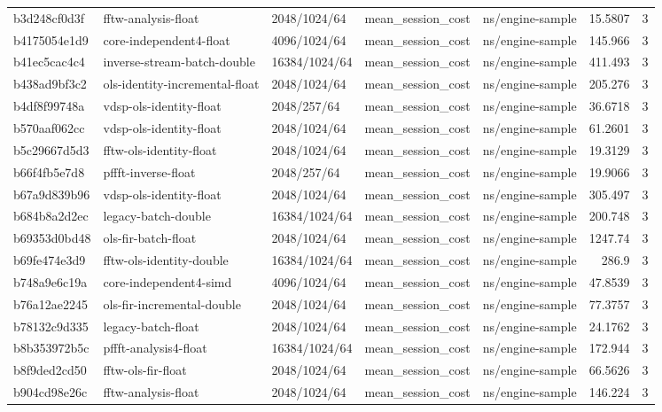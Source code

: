 \begin{longtable}{lllllrr}
b3d248cf0d3f & fftw-analysis-float & 2048/1024/64 & mean\_session\_cost & ns/engine-sample & 15.5807 & 3 \\
b4175054e1d9 & core-independent4-float & 4096/1024/64 & mean\_session\_cost & ns/engine-sample & 145.966 & 3 \\
b41ec5cac4c4 & inverse-stream-batch-double & 16384/1024/64 & mean\_session\_cost & ns/engine-sample & 411.493 & 3 \\
b438ad9bf3c2 & ols-identity-incremental-float & 2048/1024/64 & mean\_session\_cost & ns/engine-sample & 205.276 & 3 \\
b4df8f99748a & vdsp-ols-identity-float & 2048/257/64 & mean\_session\_cost & ns/engine-sample & 36.6718 & 3 \\
b570aaf062cc & vdsp-ols-identity-float & 2048/1024/64 & mean\_session\_cost & ns/engine-sample & 61.2601 & 3 \\
b5c29667d5d3 & fftw-ols-identity-float & 2048/1024/64 & mean\_session\_cost & ns/engine-sample & 19.3129 & 3 \\
b66f4fb5e7d8 & pffft-inverse-float & 2048/257/64 & mean\_session\_cost & ns/engine-sample & 19.9066 & 3 \\
b67a9d839b96 & vdsp-ols-identity-float & 2048/1024/64 & mean\_session\_cost & ns/engine-sample & 305.497 & 3 \\
b684b8a2d2ec & legacy-batch-double & 16384/1024/64 & mean\_session\_cost & ns/engine-sample & 200.748 & 3 \\
b69353d0bd48 & ols-fir-batch-float & 2048/1024/64 & mean\_session\_cost & ns/engine-sample & 1247.74 & 3 \\
b69fe474e3d9 & fftw-ols-identity-double & 16384/1024/64 & mean\_session\_cost & ns/engine-sample & 286.9 & 3 \\
b748a9e6c19a & core-independent4-simd & 4096/1024/64 & mean\_session\_cost & ns/engine-sample & 47.8539 & 3 \\
b76a12ae2245 & ols-fir-incremental-double & 2048/1024/64 & mean\_session\_cost & ns/engine-sample & 77.3757 & 3 \\
b78132c9d335 & legacy-batch-float & 2048/1024/64 & mean\_session\_cost & ns/engine-sample & 24.1762 & 3 \\
b8b353972b5c & pffft-analysis4-float & 16384/1024/64 & mean\_session\_cost & ns/engine-sample & 172.944 & 3 \\
b8f9ded2cd50 & fftw-ols-fir-float & 2048/1024/64 & mean\_session\_cost & ns/engine-sample & 66.5626 & 3 \\
b904cd98e26c & fftw-analysis-float & 2048/1024/64 & mean\_session\_cost & ns/engine-sample & 146.224 & 3 \\

\end{longtable}
